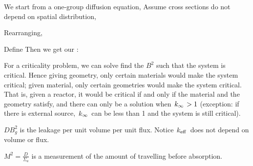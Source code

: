 \documentclass{school-22.211-notes}
\begin{document}
We start from a one-group diffusion equation,
Assume cross sections do not depend on spatial distribution, 

Rearranging, 

Define  
Then we get our :


For a criticality problem, we can solve find the $B^2$ such that the system is critical. Hence giving geometry, only certain materials would make the system critical; given material, only certain geometries would make the system critical. That is, given a reactor, it would be critical if and only if the material and the geometry satisfy,
and there can only be a solution when $\left. k_{\infty} \right. > 1$ (exception: if there is external source, $\left. k_{\infty} \right.$ can be less than 1 and the system is still critical). 


$DB^2_g$ is the leakage per unit volume per unit flux. Notice $\left. k_{\mathrm{eff}} \right.$ does not depend on volume or flux. 


 $M^2 = \frac{D}{\Sigma_a}$ is a measurement of the amount of travelling before absorption. 
\end{document}
